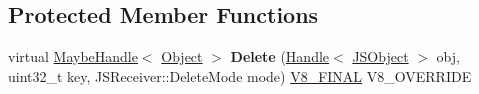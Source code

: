 \subsection*{Protected Member Functions}
\begin{DoxyCompactItemize}
\item 
\hypertarget{classv8_1_1internal_1_1_fast_elements_accessor_af575f5c4776fd98a00a9c7c1e781ecab}{}virtual \hyperlink{classv8_1_1internal_1_1_maybe_handle}{Maybe\+Handle}$<$ \hyperlink{classv8_1_1internal_1_1_object}{Object} $>$ {\bfseries Delete} (\hyperlink{classv8_1_1internal_1_1_handle}{Handle}$<$ \hyperlink{classv8_1_1internal_1_1_j_s_object}{J\+S\+Object} $>$ obj, uint32\+\_\+t key, J\+S\+Receiver\+::\+Delete\+Mode mode) \hyperlink{classv8_1_1internal_1_1_v8___f_i_n_a_l}{V8\+\_\+\+F\+I\+N\+A\+L} V8\+\_\+\+O\+V\+E\+R\+R\+I\+D\+E\label{classv8_1_1internal_1_1_fast_elements_accessor_af575f5c4776fd98a00a9c7c1e781ecab}

\end{DoxyCompactItemize}

